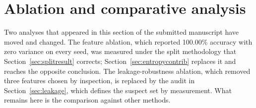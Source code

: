 \documentclass{ieeeaccess}
\begin{document}
\section{Ablation and comparative analysis}
\label{sec:comparative}

Two analyses that appeared in this section of the submitted manuscript have moved
and changed. The feature ablation, which reported 100.00\% accuracy with zero
variance on every seed, was measured under the split methodology that
Section~\ref{sec:splitresult} corrects; Section~\ref{sec:entropycontrib} replaces
it and reaches the opposite conclusion. The leakage-robustness ablation, which
removed three features chosen by inspection, is replaced by the audit in
Section~\ref{sec:leakage}, which defines the suspect set by measurement. What
remains here is the comparison against other methods.
\end{document}
